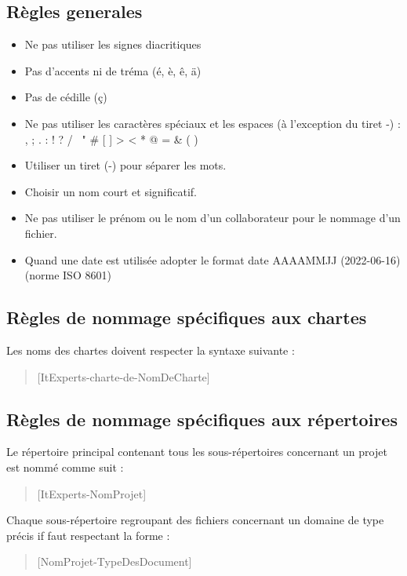 \documentclass[11pt,fleqn]{book} %
\begin{document}
\subsection{Règles generales}
\begin{itemize}
    \item Ne pas utiliser les signes diacritiques 
    \item Pas d'accents ni de tréma (é, è, ê, ä)
    \item Pas de cédille (ç)
    \item Ne pas utiliser les caractères spéciaux et les espaces (à l'exception du tiret -) : , ; . : ! ? / \ " # [ ] > <  * @ = &  ( )
    \item Utiliser un tiret (-) pour séparer les mots.
    \item Choisir un nom court et significatif.
    \item Ne pas utiliser le prénom ou le nom d'un collaborateur pour le nommage d'un fichier.
    \item Quand une date est utilisée adopter le format date AAAAMMJJ 
(2022-06-16) (norme ISO 8601)
\end{itemize}

\subsection{Règles de nommage spécifiques aux chartes}
 Les noms des chartes doivent respecter la syntaxe suivante :
\begin{quote}
    [ItExperts-charte-de-NomDeCharte]
\end{quote}
\subsection{Règles de nommage spécifiques aux répertoires}
 Le répertoire principal contenant tous les sous-répertoires concernant un 
projet est nommé comme suit : 
\begin{quote}
    [ItExperts-NomProjet] \\
\end{quote}
 Chaque sous-répertoire regroupant des fichiers concernant un domaine de type précis if faut respectant la forme :
\begin{quote}
    [NomProjet-TypeDesDocument]
\end{quote}
\end{document}
